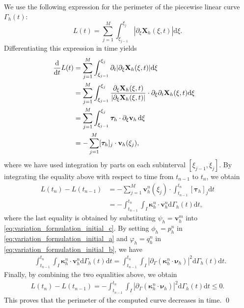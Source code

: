\documentclass[review]{elsarticle}
\def\d{{\mathrm d}}
\begin{document}
We use the following expression for the perimeter of the piecewise linear curve $\Gamma_h(t)$:
$$L(t) = \sum_{j=1}^M \int_{\xi_{j-1}}^{\xi_j} |\partial_\xi \mathbf{X}_h(\xi,t)| \d\xi.$$
Differentiating this expression in time yields
\begin{align*}
\hspace{-10pt}
\frac{\d}{\d t} L(t)
&= \sum_{j=1}^M \int_{\xi_{j-1}}^{\xi_j} \partial_{t} |\partial_\xi \mathbf{X}_h(\xi,t)| \d\xi  \\
&= \sum_{j=1}^M \int_{\xi_{j-1}}^{\xi_j} \frac{\partial_\xi \mathbf{X}_h(\xi,t)}{|\partial_\xi \mathbf{X}_h(\xi,t)|} \cdot\partial_\xi\partial_t \mathbf{X}_h(\xi,t) \d\xi \\
&= \sum_{j=1}^M \int_{\xi_{j-1}}^{\xi_j} {\boldsymbol{\tau}}_h  \cdot\partial_\xi \mathbf{v}_h \, \d\xi \\
&= - \sum_{j=1}^M [{\boldsymbol{\tau}}_h]_j \cdot  \mathbf{v}_h(\xi_j),
\end{align*}
where we have used integration by parts on each subinterval $[\xi_{j-1},\xi_j]$.
By integrating the equality above with respect to time from $t_{n-1}$ to $t_n$, we obtain
\begin{align*}
L(t_n) - L(t_{n-1})
&= - \sum_{j=1}^M \mathbf{v}_h^n(\xi_j) \cdot  \int_{t_{n-1}}^{t_n}[\boldsymbol\tau_h]_j\d t \\
&= - \int_{t_{n-1}}^{t_n} \int_{I} \boldsymbol{\kappa}_h^n \cdot \mathbf{v}_h^n\d\Gamma_h(t) \d t,
\end{align*}
where the last equality is obtained by substituting $\psi_h=\mathbf{v}_h^m$ into \eqref{eq:variation_formulation_initial_c}.
By setting ${\phi}_h = p_h^n$ in \eqref{eq:variation_formulation_initial_a} and $\varphi_h = q_h^n$ in \eqref{eq:variation_formulation_initial_b}, we have
\begin{align*}
&\int_{t_{n-1}}^{t_n}
\int_{I}  \boldsymbol{\kappa}_h^n \cdot \mathbf{v}_h^n
\d\Gamma_h(t) \d t
=
\int_{t_{n-1}}^{t_n}
\int_{I} |\partial_\Gamma (\boldsymbol{\kappa}_h^n\cdot \boldsymbol{\nu}_h)|^2  \d\Gamma_h(t) \d t .
\end{align*}
Finally, by combining the two equalities above, we obtain
\begin{align*}
L(t_n) - L(t_{n-1})
= -\int_{t_{n-1}}^{t_n}
\int_{I} |\partial_\Gamma (\boldsymbol{\kappa}_h^n\cdot \boldsymbol{\nu}_h)|^2  \d\Gamma_h(t) \d t
\le 0 .
\end{align*}
This proves that the perimeter of the computed curve decreases in time.
\qed
\end{document}
